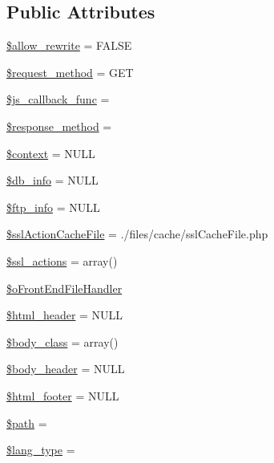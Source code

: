 \subsection*{Public Attributes}
\begin{DoxyCompactItemize}
\item 
\hyperlink{classContext_a24355a0c151bd3285c45254f773af275}{\$allow\+\_\+rewrite} = F\+A\+L\+SE
\item 
\hyperlink{classContext_a1e80f487f65708456eb17be0024aee50}{\$request\+\_\+method} = \textquotesingle{}G\+ET\textquotesingle{}
\item 
\hyperlink{classContext_afddd5e6374a20b88466dfd1cb6f32d62}{\$js\+\_\+callback\+\_\+func} = \textquotesingle{}\textquotesingle{}
\item 
\hyperlink{classContext_a383836fb81ee24d673c7145e4d2eb030}{\$response\+\_\+method} = \textquotesingle{}\textquotesingle{}
\item 
\hyperlink{classContext_a39e9103dacbca5e5fa49d6e93f0ccec3}{\$context} = N\+U\+LL
\item 
\hyperlink{classContext_a6f4d307bdcb4bfd83fda27bc265977eb}{\$db\+\_\+info} = N\+U\+LL
\item 
\hyperlink{classContext_a8b9cb334c451f773d75db73b01f86ccc}{\$ftp\+\_\+info} = N\+U\+LL
\item 
\hyperlink{classContext_a5554b6376a0703ebfbdf2bf79800bfee}{\$ssl\+Action\+Cache\+File} = \textquotesingle{}./files/cache/ssl\+Cache\+File.\+php\textquotesingle{}
\item 
\hyperlink{classContext_a9f8d33aa42d3851da1134d3ba2fbf009}{\$ssl\+\_\+actions} = array()
\item 
\hyperlink{classContext_a55e855769152e53af5e2ecb9b889c7f6}{\$o\+Front\+End\+File\+Handler}
\item 
\hyperlink{classContext_ab0146079ffcc658bbe5bbf4ba7b8e934}{\$html\+\_\+header} = N\+U\+LL
\item 
\hyperlink{classContext_af0bb833a3157d6d2153d7858cb60e435}{\$body\+\_\+class} = array()
\item 
\hyperlink{classContext_aa2c90f49a1f6389eadea8962d0fbf5b3}{\$body\+\_\+header} = N\+U\+LL
\item 
\hyperlink{classContext_ad55e79b648659c59512e02a6c0d349ff}{\$html\+\_\+footer} = N\+U\+LL
\item 
\hyperlink{classContext_a0752e74e1ec01a4fd63c044a1d3bd28b}{\$path} = \textquotesingle{}\textquotesingle{}
\item 
\hyperlink{classContext_a170ac1b95c16b53af329395df9376e9f}{\$lang\+\_\+type} = \textquotesingle{}\textquotesingle{}

\end{DoxyCompactItemize}
